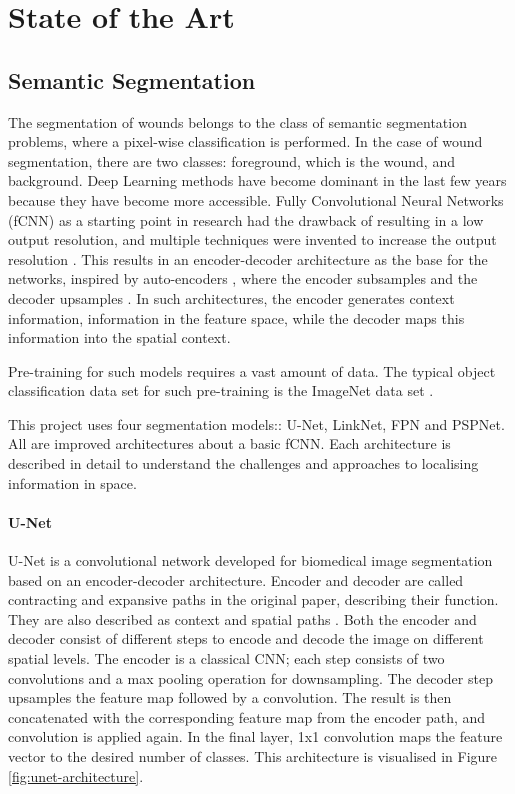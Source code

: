 \section{State of the Art}

\subsection{Semantic Segmentation}\label{sec:semantic-segmentation}

The segmentation of wounds belongs to the class of semantic segmentation problems, where a pixel-wise classification is performed. In the case of wound segmentation, there are two classes: foreground, which is the wound, and background. Deep Learning methods have become dominant in the last few years because they have become more accessible. Fully Convolutional Neural Networks (fCNN) as a starting point in research had the drawback of resulting in a low output resolution, and multiple techniques were invented to increase the output resolution \cite{Litjens2017}. This results in an encoder-decoder architecture as the base for the networks, inspired by auto-encoders \cite{LinkNet}, where the encoder subsamples and the decoder upsamples \cite{Norelyaqine2023}. In such architectures, the encoder generates context information, information in the feature space, while the decoder maps this information into the spatial context.

Pre-training for such models requires a vast amount of data. The typical object classification data set for such pre-training is the ImageNet data set \cite{SegNet}.

This project uses four segmentation models:: U-Net, LinkNet, FPN and PSPNet. All are improved architectures about a basic fCNN. Each architecture is described in detail to understand the challenges and approaches to localising information in space.

\paragraph{U-Net}

U-Net is a convolutional network developed for biomedical image segmentation based on an encoder-decoder architecture. Encoder and decoder are called contracting and expansive paths in the original paper, describing their function. They are also described as context and spatial paths \cite{MO2022626}. Both the encoder and decoder consist of different steps to encode and decode the image on different spatial levels. The encoder is a classical CNN; each step consists of two convolutions and a max pooling operation for downsampling. The decoder step upsamples the feature map followed by a convolution. The result is then concatenated with the corresponding feature map from the encoder path, and convolution is applied again. In the final layer, 1x1 convolution maps the feature vector to the desired number of classes. This architecture is visualised in Figure \ref{fig:unet-architecture}. \cite{unet}

